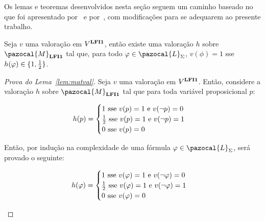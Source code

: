     Os lemas e teoremas desenvolvidos nesta seção seguem um caminho baseado no que foi apresentado por~ e por~, com modificações para se adequarem ao presente trabalho.

    \begin{lema}\label{lem:matval}
        Seja $v$ uma valoração em $V^{{\normalfont\textbf{LFI1}}}$, então existe uma valoração $h$ sobre $\pazocal{M}_{\lfium}$ tal que, para todo $\phi \in \pazocal{L}_{\Sigma}$, $v(\phi) = 1$ sse $h(\varphi) \in \{1, \frac{1}{2}{}\}$.
    \end{lema}

    \begin{proof}[Prova do Lema~\ref{lem:matval}]
        Seja $v$ uma valoração em $V^{{\normalfont\textbf{LFI1}}}$. Então, considere a valoração $h$ sobre $\pazocal{M}_{\lfium}$ tal que para toda variável proposicional $p$:
        \begin{center}
            \begin{equation*}
                h(p) =
                \begin{cases}
                  1 \text{ sse } v(p) = 1 \text{ e } v(\neg p) = 0 \\
                  \frac{1}{2}{} \text{ sse } v(p) = 1 \text{ e } v(\neg p) = 1 \\
                  0 \text{ sse } v(p) = 0
                \end{cases}
              \end{equation*}
        \end{center}

        Então, por indução na complexidade de uma fórmula $\phi \in \pazocal{L}_{\Sigma}$, será provado o seguinte:
        \begin{center}
            \begin{equation*}
                h(\varphi) =
                \begin{cases}
                  1 \text{ sse } v(\varphi) = 1 \text{ e } v(\neg \varphi) = 0 \\
                  \frac{1}{2}{} \text{ sse } v(\varphi) = 1 \text{ e } v(\neg \varphi) = 1 \\
                  0 \text{ sse } v(\varphi) = 0
                \end{cases}
              \end{equation*}
        \end{center}


\end{proof}
